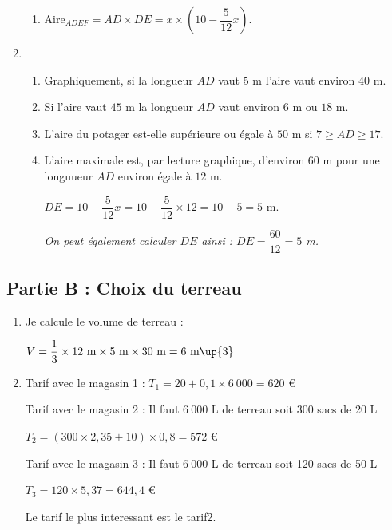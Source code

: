 \begin{enumerate}
\begin{enumerate}
        \item $\text{Aire}_{ADEF} = AD\times DE = x\times \left(10-\dfrac{5}{12}x\right)$.
    \end{enumerate}
    \item 
    \begin{enumerate}
        \item Graphiquement, si la longueur $AD$ vaut $5$ m l'aire vaut environ $40$ m.
        \item Si l'aire vaut $45$ m la longueur $AD$ vaut environ $6$ m ou $18$ m.
        \item L'aire du potager est-elle supérieure ou égale à $50$ m si $7\geq AD \geq 17$.
        \item L'aire maximale est, par lecture graphique, d'environ $60$ m pour une longuueur $AD$ environ égale à $12$ m.
        
        $DE=10-\dfrac{5}{12}x = 10-\dfrac{5}{12}\times 12 = 10-5 = 5$ m.

        \textit{On peut également calculer $DE$ ainsi : $DE=\dfrac{60}{12}=5$ m.}
    \end{enumerate}
\end{enumerate}

\subsection*{Partie B : Choix du terreau}
\begin{enumerate}
    \item Je calcule le volume de terreau :
    
    $V=\dfrac{1}{3}\times 12~\text{m}\times 5~\text{m}\times 30~\text{m} = 6~\text{m\up{3}}$

    \item Tarif avec le magasin 1 : $T_1 = 20+0,1\times 6~000 = 620$ \euro
    
    Tarif avec le magasin 2 : Il faut $6~000$ L de terreau soit 300 sacs de 20 L    
    
    $T_2 = (300\times 2,35+10)\times 0,8 = 572$ \euro

    Tarif avec le magasin 3 : Il faut $6~000$ L de terreau soit 120 sacs de 50 L
    
    $T_3 = 120\times 5,37 = 644,4$ \euro

    Le tarif le plus interessant est le tarif2.

\end{enumerate}

